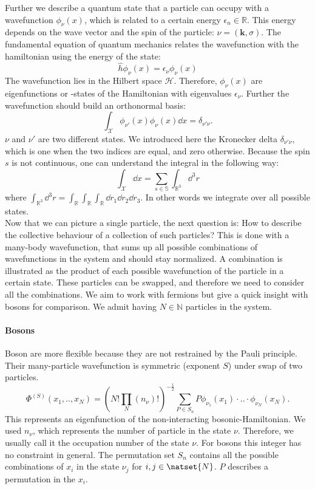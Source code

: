 \documentclass[../main.tex]{subfile}
\begin{document}
Further we describe a quantum state that a particle can occupy with a wavefunction $\phi_{\nu}(x)$, 
which is related to a certain energy $\epsilon_n \in\mathbb{R}$. This energy depends on 
the wave vector and the spin of the particle: $\nu = (\bm{k}, \sigma)$. The fundamental equation of
quantum mechanics relates the wavefunction with the hamiltonian using the energy of the state:
\[
    \hat{h} \phi_{\nu}(x) = \epsilon_\nu \phi_{\nu}(x)
\]
The wavefunction lies in the Hilbert space $\mathcal{H}$. Therefore, $\phi_{\nu}(x)$ are eigenfunctions or -states of
the Hamiltonian with eigenvalues $\epsilon_{\nu}$. Further the wavefunction should build an orthonormal basis:
\[
    \int_\mathcal{X} \phi_{\nu'}(x) \phi_{\nu}(x) \dd x = \delta_{\nu'\nu}.
\]
$\nu$ and $\nu'$ are two different states. We introduced here the Kronecker delta $\delta_{\nu'\nu}$, which is one when the two indices
are equal, and zero otherwise. Because the spin $s$ is not continuous, one can understand the integral in the following way:
\[
    \int_\mathcal{X} \dd x = \sum_{s\in \mathbb{S}} \int_{\mathbb{R}^3} \dd^3 r
\]  
where $ \int_{\mathbb{R}^3}\dd^3 r = \int_{\mathbb{R}}\int_{\mathbb{R}}\int_{\mathbb{R}} \dd r_1 \dd r_2 \dd r_3$.
In other words we integrate over all possible states.\\

Now that we can picture a single particle, the next question is: How to describe the collective behaviour of a collection of such particles?
This is done with a many-body wavefunction, that sums up all possible combinations of wavefunctions in the system and should stay normalized. 
A combination is illustrated as the product of each possible wavefunction of the particle in a certain state. These particles
can be swapped, and therefore we need to consider all the combinations.
We aim to work with fermions but give a quick insight with bosons for comparison. We admit having $N \in \mathbb{N}$ particles in the system.\\

\paragraph{Bosons}$~$\\

Boson are more flexible because they are not restrained by the Pauli principle.
Their many-particle wavefunction is symmetric (exponent $S$) under swap of two particles.
\[
    \Phi^{(S)}(x_1,..,x_N) = \left(N!\prod_{N}(n_{\nu})!\right)^{-\frac{1}{2}} \sum_{P\in S_n} P \phi_{\nu_1}(x_1)\cdot ..\cdot \phi_{\nu_N}(x_N).
\]
This represents an eigenfunction of the non-interacting bosonic-Hamiltonian.
We used $n_{\nu}$, which represents the number of particle in the state $\nu$. Therefore, we usually call it the occupation number of the state $\nu$.
For bosons this integer has no constraint in general.
The permutation set $S_n$ contains all the possible combinations of $x_i$ in the state $\nu_j$ for $i,j\in\natset{N}$. $P$ describes a permutation
in the $x_i$.\\
\end{document}
